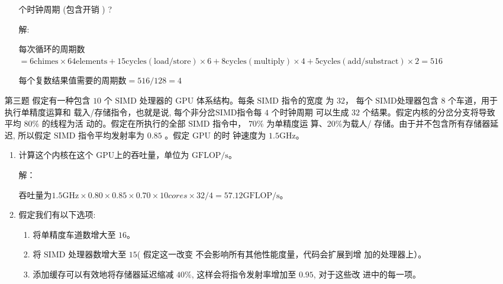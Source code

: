 \documentclass{ctexart}
\begin{document}
\begin{enumerate}
\begin{enumerate}
                    个时钟周期 (包含开销 ) ?
                    \par 解:
                    \par 每次循环的周期数$=6\mathrm{chimes}\times 64\mathrm{elements}+15\mathrm{cycles(load/store)}
                        \times6+8\mathrm{cycles(multiply)}\times 4+5\mathrm{cycles(add/substract)}
                        \times 2=516$
                    \par 每个复数结果值需要的周期数$=516/128=4$
          \end{enumerate}

    \item[第三题] 假定有一种包含 $10$ 个 $\mathrm{SIMD}$ 处理器的
          $\mathrm{GPU}$ 体系结构。每条 $\mathrm{SIMD}$ 指令的宽度 为 $32$，
          每个 $\mathrm{SIMD}$处理器包含 $8$ 个车道，用于执行单精度运算和
          载入/存储指令，也就是说, 每个非分岔$\mathrm{SIMD}$指令每 $4$ 个时钟周期
          可以生成 $32$ 个结果。假定内核的分岔分支将导致平均 $80 \%$ 的线程为活
          动的。假定在所执行的全部 $\mathrm{SIMD}$ 指令中， $70 \%$ 为单精度运
          算、20\%为载人/ 存储。由于并不包含所有存储器延迟, 所以假定
          $\mathrm{SIMD}$ 指令平均发射率为 $0.85$ 。假定 $\mathrm{GPU}$ 的时
          钟速度为 $1.5 \mathrm{GHz}$。
          \begin{enumerate}
              \item 计算这个内核在这个 $\mathrm{GPU}$上的吞吐量，单位为 $\mathrm{GFLOP/s}$。
                    \par 解：
                    \par 吞吐量为$1.5\mathrm{GHz}\times 0.80\times 0.85\times 0.70\times 10cores\times32/4=57.12\mathrm{GFLOP/s}$。

              \item 假定我们有以下选项:\begin{enumerate}
                        \item 将单精度车道数增大至 $16$。
                        \item 将 $\mathrm{SIMD}$ 处理器数增大至 $15 $( 假定这一改变
                              不会影响所有其他性能度量，代码会扩展到增 加的处理器上）。
                        \item 添加缓存可以有效地将存储器延迟缩减 $40 \%$, 这样会将指令发射率增加至 $0.95$, 对于这些改
                              进中的每一项。


                    \end{enumerate}



\end{enumerate}
\end{enumerate}
\end{document}
